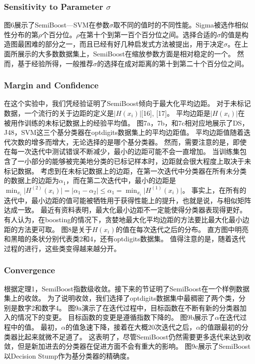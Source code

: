 \documentclass[10pt,journal,compsoc]{IEEEtran}
\begin{document}
\subsubsection{Sensitivity to Parameter $\sigma$}
图6展示了SemiBoost—SVM在参数$\sigma$取不同的值时的不同性能。Sigma被选作相似性分布的第$\rho$个百分位。$\rho$在第十个到第一百个百分位之间。选择合适的$\sigma$的值是构造图最困难的部分之一，而且已经有好几种启发式方法被提出，用于决定$\sigma$。在上面所展示的大多数数据集上，SemiBoost在缩放参数方面是相对稳定的一个。
然而，基于经验所得，一般推荐$\sigma$的选择在成对距离的第十到第二十个百分位之间。

\subsubsection{Margin and Confidence}
在这个实验中，我们凭经验证明了SemiBoost倾向于最大化平均边距。
对于未标记数据，一个流行的关于边距的定义是$\vert H(x_i) \vert$[16], [17]。
平均边距是$\vert H(x_i) \vert$在被用作训练的未标记数据上的经验平均值。
图7a，7b，和7c相对应地展示了DS，J48，SVM这三个基分类器在optdigits数据集上的平均边距值。
平均边距值随着迭代次数的增多而增大，无论选择的是哪个基分类器。
然而，需要注意的是，即使在每一次迭代中测试错误不断减少，最小的边距可能不会一直增加。
当训练集包含了一小部分的能够被完美地分类的已标记样本时，边距就会很大程度上取决于未标记数据。
考虑到在未标记数据上的边距，在第一次迭代中分类器在所有未分类的数据上的边距为$\alpha_1$，而在第二次迭代中，最小的边距是
$\min_{x_i}\vert H^{(2)}(x_i)\vert = \vert\alpha_1-\alpha_2\vert\leq\alpha_1=\min_{x_i}\vert H^{(1)}(x_i)\vert$。
事实上，在所有的迭代中，最小边距的值可能被牺牲用于获得性能上的提升，也就是说，与相似矩阵达成一致。
最近有资料表明，最大化最小边距不一定能使得分类器表现得更好。
有人认为，在boosting的情况下，贪婪地最大化平均边距的方法要比最大化最小边距的方法更可取。
图8是关于$H(x_i)$的值在每次迭代之后的分布。
直方图中明亮和黑暗的条状分别代表类2和4，还有optdigits数据集。
值得注意的是，随着迭代过程的进行，这些类变得越来越分开。

\subsubsection{Convergence}
根据定理1，SemiBoost指数级收敛。接下来的节证明了SemiBoost在一个样例数据集上的收敛。
为了说明收敛，我们选择了optdigits数据集中最稠密了两个类，分别是数字2和数字4。
图9a演示了在迭代过程中，目标函数在不断有新的分类器加入的情况下的变更。
目标函数的变更是遵循指数下降的。
图9b展示了$\alpha$在迭代过程中的值。
最初，$\alpha$的值急速下降，接着在大概20次迭代之后，$\alpha$的值跟最初的分类器比起来就微不足道了。
这表明了，尽管SemiBoost仍然需要更多迭代来达到收敛，但是新加进去的分类器在促进方面不会有重大的影响。
图9c展示了SemiBoost以Decision Stump作为基分类器的精确度。
\end{document}
